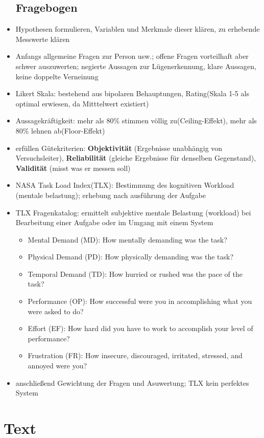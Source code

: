 \documentclass[12pt,landscape]{article}
\begin{document}
\begin{multicols}{3}
\begin{itemize}
\subsection{Fragebogen}
\item Hypothesen formulieren, Variablen und Merkmale dieser klären, zu erhebende Messwerte klären \item Anfangs allgemeine Fragen zur Person usw.; offene Fragen vorteilhaft aber schwer auszuwerten; negierte Aussagen zur Lügenerkennung, klare Aussagen, keine doppelte Verneinung
\item Likert Skala: bestehend aus bipolaren Behauptungen, Rating(Skala 1-5 als optimal erwiesen, da Mitttelwert existiert)
\item Aussagekräftigkeit: mehr als 80\% stimmen völlig zu(Ceiling-Effekt), mehr als 80\% lehnen ab(Floor-Effekt) 
\item erfüllen Gütekriterien: \textbf{Objektivität} (Ergebnisse unabhängig von Versuchsleiter), \textbf{Reliabilität} (gleiche Ergebnisse für denselben Gegenstand), \textbf{Validität} (misst was er messen soll)
\item NASA Task Load Index(TLX): Bestimmung des kognitiven Workload (mentale belastung); erhebung nach ausführung der Aufgabe
\item TLX Fragenkatalog: ermittelt subjektive mentale Belastung (workload) bei Bearbeitung einer Aufgabe oder im Umgang mit einem System 
\begin{itemize}
\item Mental Demand (MD): How mentally demanding was the task?
\item Physical Demand (PD): How physically demanding was the task?
\item Temporal Demand (TD): How hurried or rushed was the pace of the task?
\item Performance (OP): How successful were you in accomplishing what you were asked to do?
\item Effort (EF): How hard did you have to work to accomplish your level of performance?
\item Frustration (FR): How insecure, discouraged, irritated, stressed, and annoyed were you?
\end{itemize}   
\item anschließend Gewichtung der Fragen und Asuwertung; TLX kein perfektes System
\end{itemize}


\section{Text}

\end{multicols}
\end{document}
